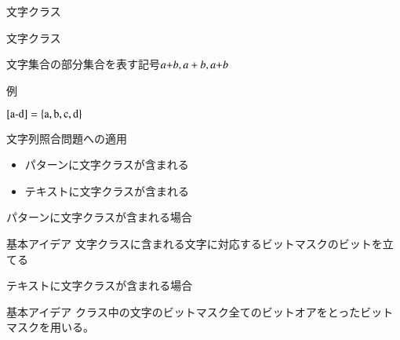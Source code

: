 \documentclass[dvipdfmx,12pt,beamer]{standalone}
\begin{document}
\begin{frame}{文字クラス}
	\begin{block}{文字クラス}
		
		文字集合の部分集合を表す記号$a\mathchar`+b, a+b, a\text{+}b$
		
		例

		$[\text{a}\mathchar`-\text{d}] = \{\text{a},\text{b},\text{c},\text{d}\}$
	\end{block}
	\begin{block}{文字列照合問題への適用}
		\begin{itemize}
			\item パターンに文字クラスが含まれる
			\item テキストに文字クラスが含まれる
		\end{itemize}
	\end{block}
\end{frame}

\begin{frame}{パターンに文字クラスが含まれる場合}
	\begin{block}{基本アイデア}
			文字クラスに含まれる文字に対応するビットマスクのビットを立てる
	\end{block}
	
\end{frame}

\begin{frame}{テキストに文字クラスが含まれる場合}
	\begin{block}{基本アイデア}	
			クラス中の文字のビットマスク全てのビットオアをとったビットマスクを用いる。
	\end{block}
\end{frame}
\end{document}
